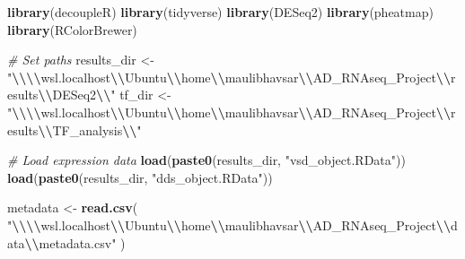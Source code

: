 \documentclass[
]{article}
\newenvironment{Shaded}{\begin{snugshade}}{\end{snugshade}}
\newcommand{\CommentTok}[1]{\textcolor[rgb]{0.56,0.35,0.01}{\textit{#1}}}
\newcommand{\FunctionTok}[1]{\textcolor[rgb]{0.13,0.29,0.53}{\textbf{#1}}}
\newcommand{\NormalTok}[1]{#1}
\newcommand{\OtherTok}[1]{\textcolor[rgb]{0.56,0.35,0.01}{#1}}
\newcommand{\SpecialCharTok}[1]{\textcolor[rgb]{0.81,0.36,0.00}{\textbf{#1}}}
\newcommand{\StringTok}[1]{\textcolor[rgb]{0.31,0.60,0.02}{#1}}
\begin{document}
\begin{Shaded}
\begin{Highlighting}[]
\FunctionTok{library}\NormalTok{(decoupleR)}
\FunctionTok{library}\NormalTok{(tidyverse)}
\FunctionTok{library}\NormalTok{(DESeq2)}
\FunctionTok{library}\NormalTok{(pheatmap)}
\FunctionTok{library}\NormalTok{(RColorBrewer)}

\CommentTok{\# Set paths}
\NormalTok{results\_dir }\OtherTok{\textless{}{-}} \StringTok{"}\SpecialCharTok{\textbackslash{}\textbackslash{}\textbackslash{}\textbackslash{}}\StringTok{wsl.localhost}\SpecialCharTok{\textbackslash{}\textbackslash{}}\StringTok{Ubuntu}\SpecialCharTok{\textbackslash{}\textbackslash{}}\StringTok{home}\SpecialCharTok{\textbackslash{}\textbackslash{}}\StringTok{maulibhavsar}\SpecialCharTok{\textbackslash{}\textbackslash{}}\StringTok{AD\_RNAseq\_Project}\SpecialCharTok{\textbackslash{}\textbackslash{}}\StringTok{results}\SpecialCharTok{\textbackslash{}\textbackslash{}}\StringTok{DESeq2}\SpecialCharTok{\textbackslash{}\textbackslash{}}\StringTok{"}
\NormalTok{tf\_dir      }\OtherTok{\textless{}{-}} \StringTok{"}\SpecialCharTok{\textbackslash{}\textbackslash{}\textbackslash{}\textbackslash{}}\StringTok{wsl.localhost}\SpecialCharTok{\textbackslash{}\textbackslash{}}\StringTok{Ubuntu}\SpecialCharTok{\textbackslash{}\textbackslash{}}\StringTok{home}\SpecialCharTok{\textbackslash{}\textbackslash{}}\StringTok{maulibhavsar}\SpecialCharTok{\textbackslash{}\textbackslash{}}\StringTok{AD\_RNAseq\_Project}\SpecialCharTok{\textbackslash{}\textbackslash{}}\StringTok{results}\SpecialCharTok{\textbackslash{}\textbackslash{}}\StringTok{TF\_analysis}\SpecialCharTok{\textbackslash{}\textbackslash{}}\StringTok{"}

\CommentTok{\# Load expression data}
\FunctionTok{load}\NormalTok{(}\FunctionTok{paste0}\NormalTok{(results\_dir, }\StringTok{"vsd\_object.RData"}\NormalTok{))}
\FunctionTok{load}\NormalTok{(}\FunctionTok{paste0}\NormalTok{(results\_dir, }\StringTok{"dds\_object.RData"}\NormalTok{))}

\NormalTok{metadata }\OtherTok{\textless{}{-}} \FunctionTok{read.csv}\NormalTok{(}
    \StringTok{"}\SpecialCharTok{\textbackslash{}\textbackslash{}\textbackslash{}\textbackslash{}}\StringTok{wsl.localhost}\SpecialCharTok{\textbackslash{}\textbackslash{}}\StringTok{Ubuntu}\SpecialCharTok{\textbackslash{}\textbackslash{}}\StringTok{home}\SpecialCharTok{\textbackslash{}\textbackslash{}}\StringTok{maulibhavsar}\SpecialCharTok{\textbackslash{}\textbackslash{}}\StringTok{AD\_RNAseq\_Project}\SpecialCharTok{\textbackslash{}\textbackslash{}}\StringTok{data}\SpecialCharTok{\textbackslash{}\textbackslash{}}\StringTok{metadata.csv"}
\NormalTok{)}
\end{Highlighting}
\end{Shaded}
\end{document}
